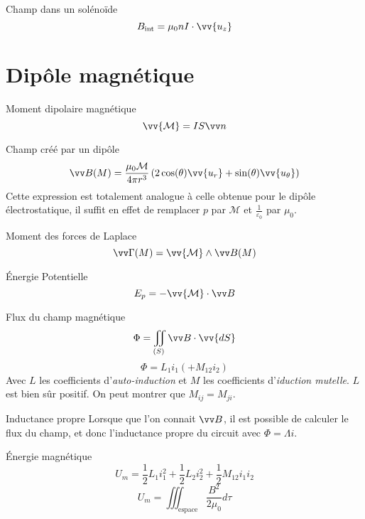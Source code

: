 \documentclass[french, a4paper, 11pt, twocolumn]{article}
\newcommand{\inv}[1]{\dfrac{1}{#1}}
\newcommand{\po}{\left(}         %
\newcommand{\pf}{\right)}        %
\newcommand{\pof}[1]{\po #1 \pf} %
\newcommand{\vect}[1]{\vv{#1}}
\newcommand{\uz}{\vect{u_z}}          %
\newcommand{\ur}{\vect{u_r}}          %
\newcommand{\uth}{\vect{u_\theta}}    %
\begin{document}
\begin{cadre}{Champ dans un solénoïde}
  \[B_{\text{int}}=\mu_{0}nI\cdot\uz\]
\end{cadre}

\section{Dipôle magnétique}
\begin{cadre}{Moment dipolaire magnétique}
  \[\vv{\mathcal M} = IS\vv n\]
\end{cadre}

\begin{cadre}{Champ créé par un dipôle}
  \[\vv B(M) = \dfrac{\mu_0\mathcal M}{4\pi r^3}\pof{2\cos(\theta)\ur + \sin(\theta)\uth}\]
  Cette expression est totalement analogue à celle obtenue pour le dipôle électrostatique, il suffit en effet de remplacer $p$ par $\mathcal M$ et $\frac{1}{\varepsilon_{0}}$ par $\mu_{0}$.
\end{cadre}

\begin{cadre}{Moment des forces de Laplace}
\[\vv\Gamma(M) = \vv{\mathcal M}\wedge \vv B(M)\]
\end{cadre}

\begin{cadre}{Énergie Potentielle}
  \[E_{p} = -\vv{\mathcal M}\cdot \vv B\]
\end{cadre}

\begin{cadre}{Flux du champ magnétique}
  \[\Phi = \iint_{(S)}\vv B\cdot\vv{dS}\]
  \[\Phi = L_{1}i_{1} (+ M_{12} i_{2})\]
  Avec $L$ les coefficients d'\emph{auto-induction} et $M$ les coefficients d'\emph{iduction mutelle}.
  $L$ est bien sûr positif.
  On peut montrer que $M_{ij} = M_{ji}$.
\end{cadre}

\begin{cadre}{Inductance propre}
  Lorsque que l'on connait $\vv B$, il est possible de calculer le flux du champ, et donc l'inductance propre du circuit avec $\Phi =\Lambda i$.
\end{cadre}

\begin{cadre}{Énergie magnétique}
  \[U_{m} = \inv{2}L_{1}i_{1}^{2}+\inv{2}L_{2}i_{2}^{2}+\inv{2}M_{12}i_{1}i_{2}\]
  \[U_{m} = \iiint_{\text{espace}}\dfrac{B^{2}}{2\mu_{0}}d\tau\]
\end{cadre}
\end{document}
